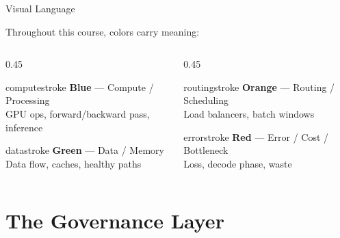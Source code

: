 \documentclass[aspectratio=169, 12pt]{beamer}
\begin{document}
\begin{frame}{Visual Language}

\small
Throughout this course, colors carry meaning:

\vspace{0.3cm}
\begin{columns}[T]
  \begin{column}{0.45\textwidth}
    \begin{mlsyscard}{computestroke}
    \textbf{Blue} --- Compute / Processing\\
    {\footnotesize GPU ops, forward/backward pass, inference}
    \end{mlsyscard}
    \vspace{0.15cm}
    \begin{mlsyscard}{datastroke}
    \textbf{Green} --- Data / Memory\\
    {\footnotesize Data flow, caches, healthy paths}
    \end{mlsyscard}
  \end{column}
  \begin{column}{0.45\textwidth}
    \begin{mlsyscard}{routingstroke}
    \textbf{Orange} --- Routing / Scheduling\\
    {\footnotesize Load balancers, batch windows}
    \end{mlsyscard}
    \vspace{0.15cm}
    \begin{mlsyscard}{errorstroke}
    \textbf{Red} --- Error / Cost / Bottleneck\\
    {\footnotesize Loss, decode phase, waste}
    \end{mlsyscard}
  \end{column}
\end{columns}
\end{frame}



\section{The Governance Layer}
\end{document}
